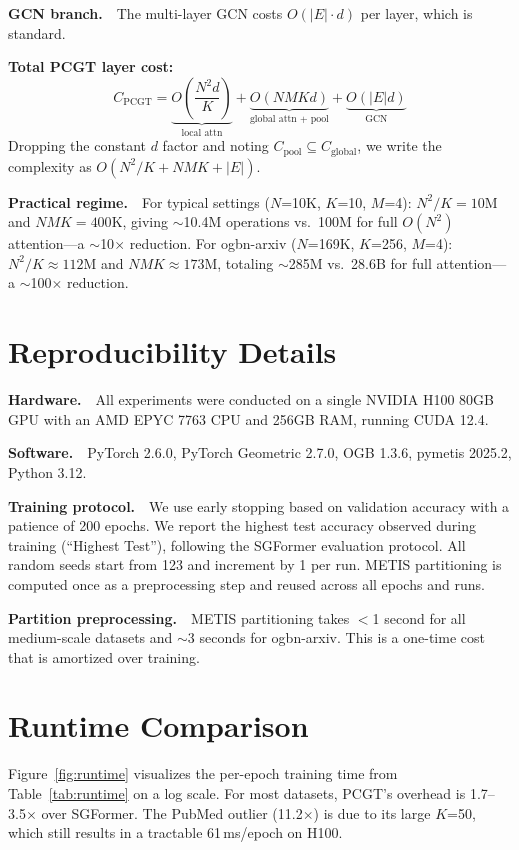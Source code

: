 \textbf{GCN branch.}~~The multi-layer GCN costs $O(|E| \cdot d)$ per layer, which is standard.

\textbf{Total PCGT layer cost:}
\begin{equation}
C_\text{PCGT} = \underbrace{O\!\left(\frac{N^2 d}{K}\right)}_{\text{local attn}} + \underbrace{O(NMKd)}_{\text{global attn + pool}} + \underbrace{O(|E|d)}_{\text{GCN}} 
\label{eq:total_cost}
\end{equation}
Dropping the constant $d$ factor and noting $C_\text{pool} \subseteq C_\text{global}$, we write the complexity as $O(N^2/K + NMK + |E|)$.

\textbf{Practical regime.}~~For typical settings ($N$=10K, $K$=10, $M$=4): $N^2/K = 10$M and $NMK = 400$K, giving $\sim$10.4M operations vs.\ 100M for full $O(N^2)$ attention---a $\sim$10$\times$ reduction. For ogbn-arxiv ($N$=169K, $K$=256, $M$=4): $N^2/K \approx 112$M and $NMK \approx 173$M, totaling $\sim$285M vs.\ 28.6B for full attention---a $\sim$100$\times$ reduction.

\section{Reproducibility Details}
\label{app:reproducibility}

\textbf{Hardware.}~~All experiments were conducted on a single NVIDIA H100 80GB GPU with an AMD EPYC 7763 CPU and 256GB RAM, running CUDA 12.4.

\textbf{Software.}~~PyTorch 2.6.0, PyTorch Geometric 2.7.0, OGB 1.3.6, pymetis 2025.2, Python 3.12.

\textbf{Training protocol.}~~We use early stopping based on validation accuracy with a patience of 200 epochs. We report the highest test accuracy observed during training (``Highest Test''), following the SGFormer evaluation protocol. All random seeds start from 123 and increment by 1 per run. METIS partitioning is computed once as a preprocessing step and reused across all epochs and runs.

\textbf{Partition preprocessing.}~~METIS partitioning takes $<$1 second for all medium-scale datasets and $\sim$3 seconds for ogbn-arxiv. This is a one-time cost that is amortized over training.

\section{Runtime Comparison}
\label{app:runtime}

Figure~\ref{fig:runtime} visualizes the per-epoch training time from Table~\ref{tab:runtime} on a log scale. For most datasets, PCGT's overhead is 1.7--3.5$\times$ over SGFormer. The PubMed outlier (11.2$\times$) is due to its large $K$=50, which still results in a tractable 61\,ms/epoch on H100.

